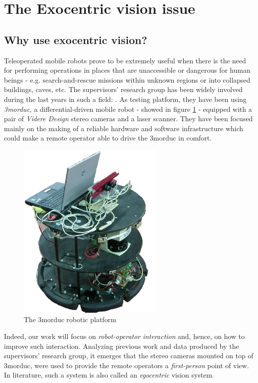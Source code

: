 \section{The Exocentric vision issue}
\label{sec:exo}
\subsection{Why use exocentric vision?}
Teleoperated mobile robots prove to be extremely useful 
when there is the need for performing operations in places that 
are unaccessible or dangerous for human beings - e.g. 
search-and-rescue missions within unknown regions or into 
collapsed buildings, caves, etc.
%
The supervisors' research group has been widely involved 
during the last years in such a field: \cite{livatino2010}.
%
As testing platform, they have been using \textit{3morduc},
a differential-driven mobile robot - showed in figure \ref{fig:3morduc} -
equipped with a pair of \textit{Videre Design} \cite{videredesign} 
stereo cameras and a laser scanner. They have been focused 
mainly on the making of a reliable hardware and software 
infrastructure which could make a remote operator able to drive 
the 3morduc in comfort.
%
\begin{figure}[!h]
  \begin{center}
    \includegraphics[width=200pt]{img/3morduc}  %
    \caption{The 3morduc robotic platform}
    \label{fig:3morduc}
  \end{center}
\end{figure}
%
Indeed, our work will focus on \textit{robot-operator interaction} and, 
hence, on how to improve such interaction. 
%
Analyzing previous work and data produced by the supervisors' 
research group, it emerges that the stereo cameras mounted on 
top of 3morduc, were used to provide the remote operators a 
\textit{first-person} point of view. In literature, such a 
system is also called an \textit{egocentric} vision system.
%

